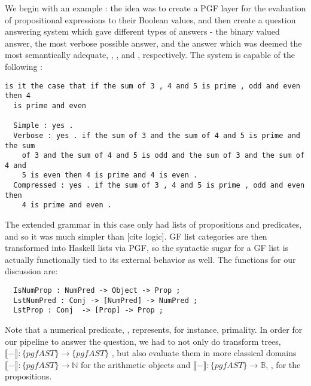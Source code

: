 We begin with an example : the idea was to create a PGF layer for the evaluation
of propositional expressions to their Boolean values, and then create a question
answering system which gave different types of answers - the binary valued
answer, the most verbose possible answer, and the answer which was deemed the
most semantically adequate, , , and
, respectively. The system is capable of the following :
\begin{verbatim}
is it the case that if the sum of 3 , 4 and 5 is prime , odd and even then 4
  is prime and even

  Simple : yes .
  Verbose : yes . if the sum of 3 and the sum of 4 and 5 is prime and the sum
    of 3 and the sum of 4 and 5 is odd and the sum of 3 and the sum of 4 and
    5 is even then 4 is prime and 4 is even .
  Compressed : yes . if the sum of 3 , 4 and 5 is prime , odd and even then
    4 is prime and even .
\end{verbatim}

The extended grammar in this case only had lists of propositions and predicates,
and so it was much simpler than [cite logic]. GF list categories are then
transformed into Haskell lists via PGF, so the syntactic sugar for a GF list is actually
functionally tied to its external behavior as well. The functions for our
discussion are:
\begin{verbatim}
  IsNumProp : NumPred -> Object -> Prop ;
  LstNumPred : Conj -> [NumPred] -> NumPred ;
  LstProp : Conj  -> [Prop] -> Prop ;
\end{verbatim}

Note that a numerical predicate, , represents, for instance,
primality. In order for our pipeline to answer the question, we had to not only
do transform trees, $\llbracket - \rrbracket : \{pgfAST\} \rightarrow
\{pgfAST\}$ , but also evaluate them in more classical domains $\llbracket -
\rrbracket : \{pgfAST\} \rightarrow \mathds{N}$ for the arithmetic objects and
$\llbracket - \rrbracket : \{pgfAST\} \rightarrow \mathds{B}$,
, for the propositions.

